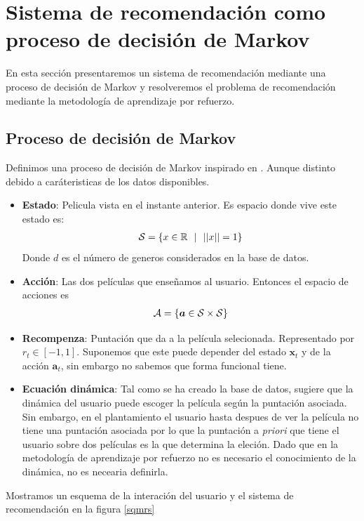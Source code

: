 
\chapter{Sistema de recomendación como proceso de decisión de Markov }

En esta sección presentaremos un sistema de recomendación mediante una proceso de decisión de Markov y resolveremos el problema de recomendación mediante la metodología de aprendizaje por refuerzo.

\section{Proceso de  decisión de Markov}
Definimos una proceso de decisión de Markov inspirado en \cite{shani2005mdp}. Aunque distinto debido a caráteristicas de los datos disponibles.
\begin{itemize}
    \item \textbf{Estado}: Pelicula vista en el instante anterior. Es espacio donde vive este estado es: 
    \begin{gather}
        \mathcal{S} = \{ x \in \mathbb{R} \ \ | \ \  ||x|| = 1\}
    \end{gather}
    Donde $d$ es el número de generos considerados en la base de datos.
    \item \textbf{Acción}: Las dos películas que enseñamos al usuario. Entonces el espacio de acciones es 
    \begin{gather}
        \mathcal{A} = \{ \bm{a} \in \mathcal{S} \times \mathcal{S} \}
    \end{gather}
    \item \textbf{Recompenza}: Puntación que da a la película selecionada. Representado por $r_t \in [-1,1]$. Suponemos que este puede depender del estado $\bm{x}_t$ y de la acción $\bm{a}_t$, sin embargo no sabemos que forma funcional tiene.
    \item \textbf{Ecuación dinámica}: Tal como se ha creado la base de datos, sugiere que la dinámica del usuario puede escoger la película según la puntación asociada. Sin embargo, en el plantamiento el usuario hasta despues de ver la película no tiene una puntación asociada por lo que la puntación a \emph{priori} que tiene el usuario sobre dos películas es la que determina la eleción. Dado que en la metodología de aprendizaje por refuerzo no es necesario el conocimiento de la dinámica, no es necearia definirla.
\end{itemize}

Mostramos un esquema de la interación del usuario y el sistema de recomendación en la figura \ref{sqmrs}

